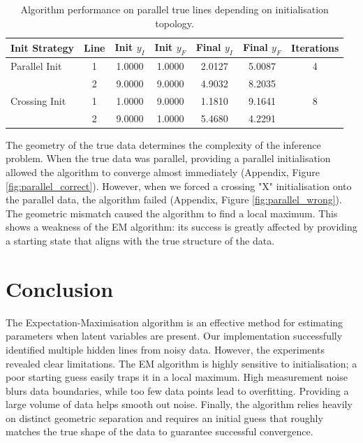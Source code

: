 \documentclass{article}
\begin{document}
\begin{table}[H]
\centering
\begin{tabular}{|l|c|c|c|c|c|c|}
\hline
\textbf{Init Strategy} & \textbf{Line} & \textbf{Init $y_I$} & \textbf{Init $y_F$} & \textbf{Final $y_I$} & \textbf{Final $y_F$} & \textbf{Iterations} \\ \hline
Parallel Init & 1 & 1.0000 & 1.0000 & 2.0127 & 5.0087 & 4 \\ 
 & 2 & 9.0000 & 9.0000 & 4.9032 & 8.2035 & \\ \hline
Crossing Init & 1 & 1.0000 & 9.0000 & 1.1810 & 9.1641 & 8 \\ 
 & 2 & 9.0000 & 1.0000 & 5.4680 & 4.2291 & \\ \hline
\end{tabular}
\caption{Algorithm performance on parallel true lines depending on initialisation topology.}
\label{tab:arrangement}
\end{table}

The geometry of the true data determines the complexity of the inference problem. When the true data was parallel, providing a parallel initialisation allowed the algorithm to converge almost immediately (Appendix, Figure \ref{fig:parallel_correct}). However, when we forced a crossing "X" initialisation onto the parallel data, the algorithm failed (Appendix, Figure \ref{fig:parallel_wrong}). The geometric mismatch caused the algorithm to find a local maximum. This shows a weakness of the EM algorithm: its success is greatly affected by providing a starting state that aligns with the true structure of the data.

\section{Conclusion}
The Expectation-Maximisation algorithm is an effective method for estimating parameters when latent variables are present. Our implementation successfully identified multiple hidden lines from noisy data. However, the experiments revealed clear limitations. The EM algorithm is highly sensitive to initialisation; a poor starting guess easily traps it in a local maximum. High measurement noise blurs data boundaries, while too few data points lead to overfitting. Providing a large volume of data helps smooth out noise. Finally, the algorithm relies heavily on distinct geometric separation and requires an initial guess that roughly matches the true shape of the data to guarantee successful convergence.

\newpage
\end{document}
